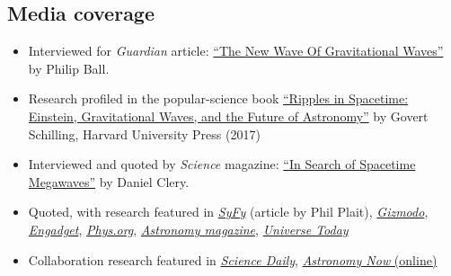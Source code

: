 \documentclass[11pt,letterpaper,sans]{moderncv}
\begin{document}
\subsection{Media coverage}
\begin{itemize}[leftmargin=8mm]
\item Interviewed for \textit{Guardian} article: {\color{color1} \href{https://www.theguardian.com/science/2021/jun/27/gravitational-waves-ligo-lisa-nanograv}{``The New Wave Of Gravitational Waves''}} by Philip Ball.
\item Research profiled in the popular-science book {\color{color1} \href{https://books.google.com/books/about/Ripples_in_Spacetime.html?id=YicuDwAAQBAJ&hl=en}{``Ripples in Spacetime: Einstein, Gravitational Waves, and the Future of Astronomy''}} by Govert Schilling, Harvard University Press (2017)
\item Interviewed and quoted by \textit{Science} magazine: {\color{color1} \href{http://science.sciencemag.org/content/351/6278/1124}{``In Search of Spacetime Megawaves''}} by Daniel Clery. %
\item Quoted, with research featured in {\color{color1} \href{https://www.syfy.com/syfywire/pulsars-black-holes-spacetime-center-of-the-solar-system}{\textit{SyFy}}} (article by Phil Plait), {\color{color1} \href{http://gizmodo.com/we-could-find-even-more-gravitational-waves-soon-with-p-1761021828}{\textit{Gizmodo}}}, {\color{color1} \href{https://www.engadget.com/2016/02/25/pulsars-gravitational-waves-black-holes/}{\textit{Engadget}}}, {\color{color1} \href{http://phys.org/news/2016-02-pulsar-web-low-frequency-gravitational.html}{\textit{Phys.org}}},  {\color{color1} \href{http://www.astronomy.com/news/2016/02/pulsar-web-could-detect-gravitational-waves}{\textit{Astronomy magazine}}}, {\color{color1} \href{http://www.universetoday.com/127562/the-future-of-gravitational-wave-astronomy-enhanced-ligo-pulsar-webs-space-interferometers-and-everything/}{\textit{Universe Today}}}
\item Collaboration research featured in {\color{color1} \href{https://www.sciencedaily.com/releases/2016/04/160405122609.htm}{\textit{Science Daily}}}, {\color{color1} \href{https://astronomynow.com/2016/04/06/gravitational-wave-search-provides-insights-into-galaxy-mergers/}{\textit{Astronomy Now} (online)}}
\end{itemize}
\end{document}
